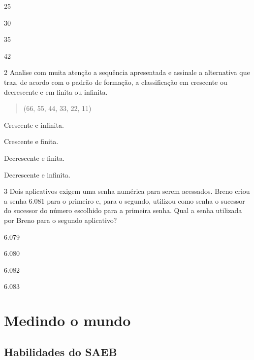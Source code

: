 \begin{escolha}
\item
  25
\item
  30
\item
  35
\item
  42
\end{escolha}


\pagebreak

\num{2} Analise com muita atenção a sequência apresentada e assinale a
alternativa que traz, de acordo com o padrão de formação, a classificação em crescente ou decrescente e
em finita ou infinita.

\begin{quote}
(66, 55, 44, 33, 22, 11)
\end{quote}

\begin{escolha}
\item
  Crescente e infinita.
\item
  Crescente e finita.
\item
  Decrescente e finita.
\item
  Decrescente e infinita.
\end{escolha}
\bigskip

\num{3} Dois aplicativos exigem uma senha numérica para serem acessados.
Breno
criou a senha 6.081 para o primeiro e, para o segundo, utilizou como senha
o sucessor do sucessor do número escolhido para a primeira senha. Qual a
senha utilizada por Breno para o segundo aplicativo?

\begin{escolha}
\item
  6.079
\item
  6.080
\item
  6.082
\item
  6.083
\end{escolha}


\chapter{Medindo o mundo}

\section*{Habilidades do SAEB}

